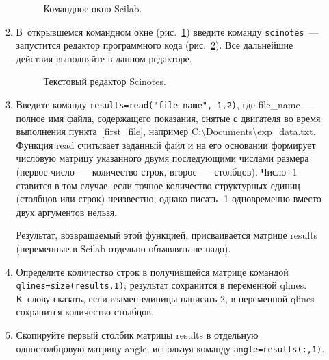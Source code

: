 \documentclass[12pt,a4paper,openany]{extarticle}
\begin{document}
\begin{enumerate}
\begin{enumerate}
\begin{figure}[h]
{	}
	\caption{Командное окно Scilab.}
	\label{scilab_command_window}
\end{figure}
\item В~открывшемся командном окне (рис.~\ref{scilab_command_window}) введите команду \verb|scinotes|~--- запустится редактор программного кода (рис.~\ref{scinotes_window}). Все дальнейшие действия выполняйте в данном редакторе.
\begin{figure}[h]
	\noindent{}
	\caption{Текстовый редактор Scinotes.}
	\label{scinotes_window}
\end{figure}
\item Введите команду \verb|results=read("file_name",-1,2)|, где file\_name~--- полное имя файла, содержащего показания, снятые с двигателя во время выполнения пункта~\ref{first_file}, например C:\textbackslash Documents\textbackslash exp\_data.txt.
Функция read считывает заданный файл и на его основании формирует числовую матрицу указанного двумя последующими числами размера (первое число~--- количество строк, второе~--- столбцов). 
Число -1 ставится в том случае, если точное количество структурных единиц (столбцов или строк) неизвестно, однако писать -1 одновременно вместо двух аргументов  нельзя. 

Результат, возвращаемый этой функцией, присваивается матрице results (переменные в Scilab отдельно объявлять не надо).
\item Определите количество строк в получившейся матрице командой \verb|qlines=size(results,1)|; результат сохранится в переменной qlines. 
К~слову сказать, если взамен единицы написать 2, в переменной qlines сохранится количество столбцов.
\item Скопируйте первый столбик матрицы results в отдельную одностолбцовую матрицу angle, используя команду \verb|angle=results(:,1)|. 


\end{enumerate}
\end{enumerate}
\end{document}
